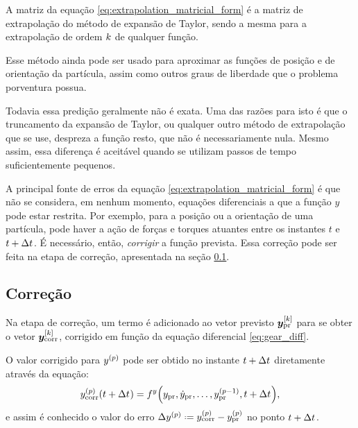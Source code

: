 A matriz da equação \eqref{eq:extrapolation_matricial_form} é a matriz de extrapolação do método de expansão de Taylor, sendo a mesma para a extrapolação de ordem \(k\) de qualquer função.

Esse método ainda pode ser usado para aproximar as funções de posição e de orientação da partícula, assim como outros graus de liberdade que o problema porventura possua.

Todavia essa predição geralmente não é exata. Uma das razões para isto é que o truncamento da expansão de Taylor, ou qualquer outro método de extrapolação que se use, despreza a função resto, que não é necessariamente nula. Mesmo assim, essa diferença é aceitável quando se utilizam passos de tempo suficientemente pequenos. 

A principal fonte de erros da equação \eqref{eq:extrapolation_matricial_form} é que não se considera, em nenhum momento, equações diferenciais a que a função \(y\) pode estar restrita. Por exemplo, para a posição ou a orientação de uma partícula, pode haver a ação de forças e torques atuantes entre os instantes \(t\) e \(t + \Delta t_{}\). É necessário, então, \textit{corrigir} a função prevista. Essa correção pode ser feita na etapa de correção, apresentada na seção \ref{subsec:correction}.

\subsection{Correção} \label{subsec:correction}

Na etapa de correção, um termo é adicionado ao vetor previsto \(\drvvec{\taylorOrder}{\predicted{y}}\) para se obter o vetor \(\drvvec{\taylorOrder}{\corrected{y}}\), corrigido em função da equação diferencial \eqref{eq:gear_diff}.

O valor corrigido para \(\deriv{\eqOrder}{y}\) pode ser obtido no instante \(t+\Delta t_{}\) diretamente através da equação:
\[
	\corrected{\deriv{\eqOrder}{y}}\pqty{t+\Dt} = \eqFor{y}\pqty{\predicted{y}, \predicted{\deriv{1}{y}},\dotsc,\predicted{\deriv{\eqOrder-1}{y}}, t+\Dt},
\]
e assim é conhecido o valor do erro \(\Delta \deriv{\eqOrder}{y} \eqdef \corrected{\deriv{\eqOrder}{y}} - \predicted{\deriv{\eqOrder}{y}}\) no ponto \(t+\Delta t_{}\).

